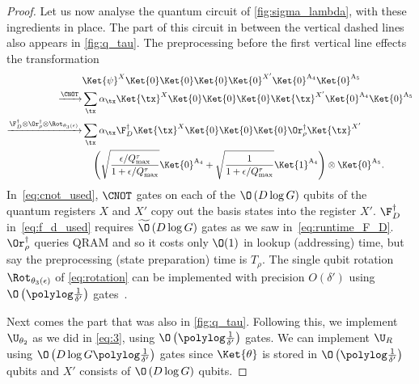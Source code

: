 \begin{proof}
  Let us now analyse the quantum circuit of \cref{fig:sigma_lambda}, with these ingredients in place.
  The part of this circuit in between the vertical dashed lines also appears in \cref{fig:q_tau}. The preprocessing before the first vertical line effects the transformation
  \begin{align}
    \label{eq:state_transformation}
    &\Ket{\psi}^X\Ket{0}\Ket{0}\Ket{0}\Ket{0}^{X'}\Ket{0}^{\text{A}_4}\Ket{0}^{\text{A}_5}\\
    \label{eq:cnot_used}
    \xrightarrow{\CNOT}&\sum_{\tx}\alpha_{\tx}\Ket{\tx}^X\Ket{0}\Ket{0}\Ket{0}\Ket{\tx}^{X'}\Ket{0}^{\text{A}_4}\Ket{0}^{\text{A}_5}\\
    \label{eq:f_d_used}
    \xrightarrow{\F_{D}^\dag\otimes\Or_\rho^\dag\otimes \Rot_{\theta_3\left(\epsilon\right)}}&\sum_{\tx}\alpha_{\tx}\F_{D}^\dag\Ket{\tx}^X\Ket{0}\Ket{0}\Ket{0} \Or_\rho^\dag\Ket{\tx}^{X'}\nonumber\\
                    &\quad\left(\sqrt{\frac{\epsilon/Q_{\max}^{\tau}}{1+\epsilon/Q_{\max}^{\tau}}}\Ket{0}^{\text{A}_4}+\sqrt{\frac{1}{1+\epsilon/Q_{\max}^{\tau}}}\Ket{1}^{\text{A}_4}\right)\otimes\Ket{0}^{\text{A}_5}.
  \end{align}
  In~\cref{eq:cnot_used}, $\CNOT$ gates on each of the $\O\left(D\log G \right)$ qubits of the quantum registers $X$ and $X'$ copy out the basis states into the register $X'$.
  $\F_{D}^\dag$ in~\cref{eq:f_d_used} requires $\widetilde{\O}\left(D\log G\right)$ gates as we saw in~\cref{eq:runtime_F_D}. $\Or_\rho^\dag$ queries QRAM and so it costs only $\O(1)$ in lookup (addressing) time, but say the preprocessing (state preparation) time is $T_\rho$. The single qubit rotation $\Rot_{\theta_3\left(\epsilon\right)}$ of \cref{eq:rotation} can be implemented with precision $O(\delta')$ using $\O\left(\polylog\frac{1}{\delta'}\right)$ gates~\cite{Nielsen2010}.

  Next comes the part that was also in \cref{fig:q_tau}. Following this, we implement $\U_{\theta_2}$ as we did in \cref{eq:3}, using $\O\left(\polylog\frac{1}{\delta'}\right)$ gates.
  We can implement $\U_R$ using $\O\left(D\log G \polylog\frac{1}{\delta'}\right)$ gates since $\Ket{\theta}$ is stored in $\O\left(\polylog\frac{1}{\delta'}\right)$ qubits and $X'$ consists of $\O\left(D\log G \right)$ qubits.


\end{proof}
